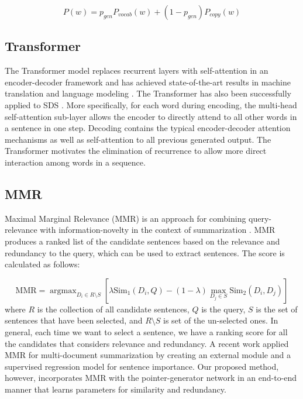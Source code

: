 \documentclass[11pt,a4paper]{article}
\makeatletter
\DeclareMathOperator*{\argmax}{argmax} \newcommand{\specialcell}[2][c]{\begin{tabular}[#1]{@{}c@{}}#2\end{tabular}}
\makeatother
\begin{document}
\begin{dmath} 
P(w) = p_{gen}P_{vocab}(w) + (1-p_{gen})P_{copy}(w)
\end{dmath} 






\subsection{Transformer}
The Transformer model replaces recurrent layers with self-attention in an encoder-decoder framework and has achieved state-of-the-art results in machine translation \cite{vaswani2017attention} and language modeling \cite{baevski2018adaptive, dai2019transformerxl}. The Transformer has also been successfully applied to SDS \cite{Gehrmann:18}. More specifically, for each word during encoding, the multi-head self-attention sub-layer allows the encoder to directly attend to all other words in a sentence in one step. Decoding contains the typical encoder-decoder attention mechanisms as well as self-attention to all previous generated output. The Transformer motivates the elimination of recurrence to allow more direct interaction among words in a sequence. 




\subsection{MMR}
Maximal Marginal Relevance (MMR) is an approach for combining query-relevance with information-novelty in the context of summarization \cite{carbonell1998use}. MMR produces a ranked list of the candidate sentences based on the relevance and redundancy to the query, which can be used to extract sentences. The score is calculated as follows: 



\begin{dmath} 
\label{eq:mmr}
{\text{MMR}}=\argmax_{ D_{ i }\in R\setminus S }  \left[ \lambda { \text{Sim} }_{ 1 } (D_{ i },Q)-(1-\lambda )\max _{ D_{ j }\in S }{ \text{Sim}_2 }(D_{ i },D_{ j } ) \right]
\end{dmath}
where $R$ is the collection of all candidate sentences, $Q$ is the query, $S$ is the set of sentences that have been selected, and $R \setminus  S$ is set of the un-selected ones. In general, each time we want to select a sentence, we have a ranking score for all the candidates that considers relevance and redundancy. 
A recent work \cite{lebanoff18mds} applied MMR for multi-document summarization by creating an external module and a supervised regression model for sentence importance. Our proposed method, however, incorporates MMR with the pointer-generator network in an end-to-end manner that learns parameters for similarity and redundancy. 
\end{document}
